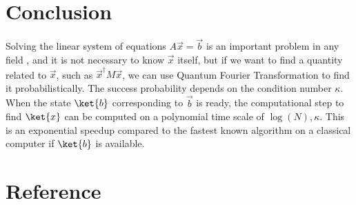 \documentclass[b5paper,papersize,dvipdfmx,fleqn]{article}
\begin{document}
\section{Conclusion}
Solving the linear system of equations $A\vec{x}=\vec{b}$ is an important problem in any field \cite{Harrow2009}, and it is not necessary to know $\vec{x}$ itself, but if we want to find a quantity related to $\vec{x}$, such as $\vec{x}^\dagger M\vec{x}$, we can use Quantum Fourier Transformation to find it probabilistically. The success probability depends on the condition number $\kappa $.
When the state $\ket{b}$ corresponding to $\vec{b}$ is ready, the computational step to find $\ket{x}$ can be computed on a polynomial time scale of $\log(N), \kappa $. This is an exponential speedup compared to the fastest known algorithm on a classical computer if $\ket{b}$ is available.


\section{Reference}


%
%
%

\end{document}
